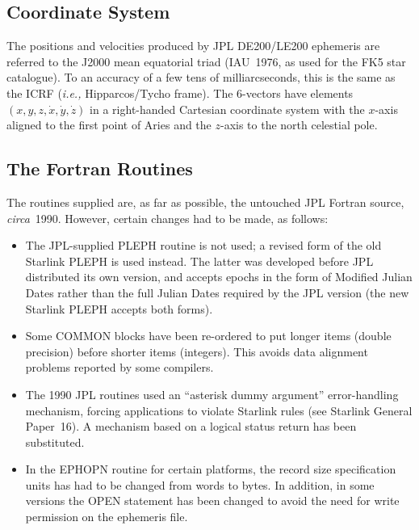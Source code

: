 \documentclass[twoside,11pt,nolof]{starlink}
\begin{document}
\subsection{Coordinate System}
\label{coordinate_system}

The positions and velocities produced by JPL DE200/LE200 ephemeris are
referred to the J2000 mean equatorial triad (IAU~1976, as used for the
FK5 star catalogue).  To an accuracy of a few tens of milliarcseconds,
this is the same as the ICRF (\emph{i.e.,}\/ Hipparcos/Tycho frame).
The 6-vectors have elements $( x, y, z, \dot{x},
\dot{y}, \dot{z} )$ in a right-handed Cartesian coordinate system with
the $x$-axis aligned to the first point of Aries and the $z$-axis to
the north celestial pole.

\subsection{The Fortran Routines}
\label{the_fortran_routines}

The routines supplied are, as far as possible, the untouched JPL Fortran
source, \textit{circa}\/~1990.  However, certain changes had to be made,
as follows:

\begin{itemize}

\item The JPL-supplied PLEPH routine is not used;  a revised form of the
old Starlink PLEPH is used instead.  The latter was developed before JPL
distributed its own version, and accepts epochs in the form of Modified
Julian Dates rather than the full Julian Dates required by the JPL version
(the new Starlink PLEPH accepts both forms).

\item Some COMMON blocks have been re-ordered to put longer items (double
precision) before shorter items (integers).  This avoids data alignment
problems reported by some compilers.

\item The 1990 JPL routines used an ``asterisk dummy argument''
error-handling mechanism, forcing applications to violate Starlink rules
(see Starlink General Paper~16).  A mechanism based on a logical status
return has been substituted.

\item In the EPHOPN routine for certain platforms, the record size
specification units has had to be changed from words to bytes.
In addition, in some versions the OPEN statement has been changed to
avoid the need for write permission on the ephemeris file.  \end{itemize}
\end{document}
